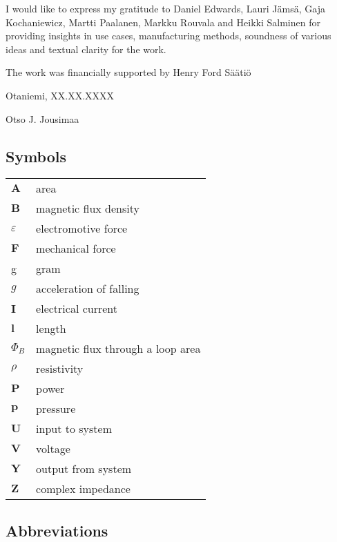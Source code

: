 \documentclass[english,12pt,a4paper,pdftex,elec,utf8]{aaltothesis}
\begin{document}
I would like to express my gratitude to Daniel Edwards, Lauri Jämsä, Gaja Kochaniewicz, Martti Paalanen, Markku Rouvala and Heikki Salminen for providing insights in use cases, manufacturing methods, soundness of various ideas and textual clarity for the work.  

The work was financially supported by Henry Ford S\"a\"ati\"o

\vspace{5cm}
Otaniemi, XX.XX.XXXX

\vspace{5mm}
{\hfill Otso J. Jousimaa \hspace{1cm}}

\newpage


\thesistableofcontents



\subsection*{Symbols}

\begin{tabular}{ll}
$\mathbf{A}$  & area \\
$\mathbf{B}$  & magnetic flux density  \\
$\varepsilon$ & electromotive force \\
$\mathbf{F}$  & mechanical force \\
g             & gram \\
$g$           & acceleration of falling \\ 
$\mathbf{I}$  & electrical current \\
$\mathbf{l}$  & length \\
$\Phi_{B}$    & magnetic flux through a loop area \\
$\rho$        & resistivity \\
$\mathbf{P}$  & power \\
$\mathbf{p}$  & pressure \\
$\mathbf{U}$  & input to system \\
$\mathbf{V}$  & voltage \\
$\mathbf{Y}$  & output from system \\
$\mathbf{Z}$  & complex impedance
\end{tabular}

\subsection*{Abbreviations}
\end{document}
